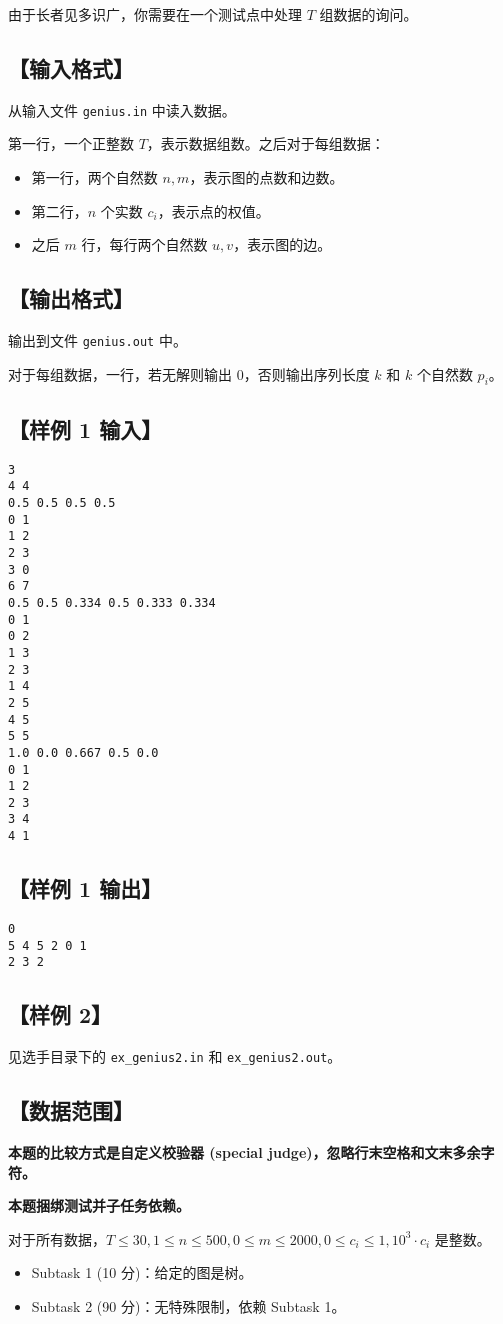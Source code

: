 \documentclass[UTF8]{ctexart}
\begin{document}
	由于长者见多识广，你需要在一个测试点中处理 $T$ 组数据的询问。
	\subsection*{【输入格式】}
	从输入文件 \texttt{genius.in} 中读入数据。
	
	第一行，一个正整数 $T$，表示数据组数。之后对于每组数据：
	\begin{itemize}
		\item{第一行，两个自然数 $n,m$，表示图的点数和边数。}
		\item{第二行，$n$ 个实数 $c_i$，表示点的权值。}
		\item{之后 $m$ 行，每行两个自然数 $u,v$，表示图的边。}
	\end{itemize}
	\subsection*{【输出格式】}
	输出到文件 \texttt{genius.out} 中。
	
	对于每组数据，一行，若无解则输出 $0$，否则输出序列长度 $k$ 和 $k$ 个自然数 $p_i$。
	\subsection*{【样例 1 输入】}
	\begin{lstlisting}
3
4 4
0.5 0.5 0.5 0.5
0 1
1 2
2 3
3 0
6 7
0.5 0.5 0.334 0.5 0.333 0.334
0 1
0 2
1 3
2 3
1 4
2 5
4 5
5 5
1.0 0.0 0.667 0.5 0.0
0 1
1 2
2 3
3 4
4 1
	\end{lstlisting}
	\subsection*{【样例 1 输出】}
	\begin{lstlisting}
0
5 4 5 2 0 1
2 3 2
	\end{lstlisting}
	\subsection*{【样例 2】}
	见选手目录下的 \texttt{ex\_genius2.in} 和 \texttt{ex\_genius2.out}。
	\subsection*{【数据范围】}
	\textbf{本题的比较方式是自定义校验器 (special judge)，忽略行末空格和文末多余字符。}
	
	\textbf{本题捆绑测试并子任务依赖。}
	
	对于所有数据，$T\le 30,1\le n\le 500,0\le m\le 2000,0\le c_i\le 1,10^3\cdot c_i$ 是整数。
	\begin{itemize}
		\item{Subtask 1 (10 分)：给定的图是树。}
		\item{Subtask 2 (90 分)：无特殊限制，依赖 Subtask 1。}
	\end{itemize}
	\newpage
\end{document}
